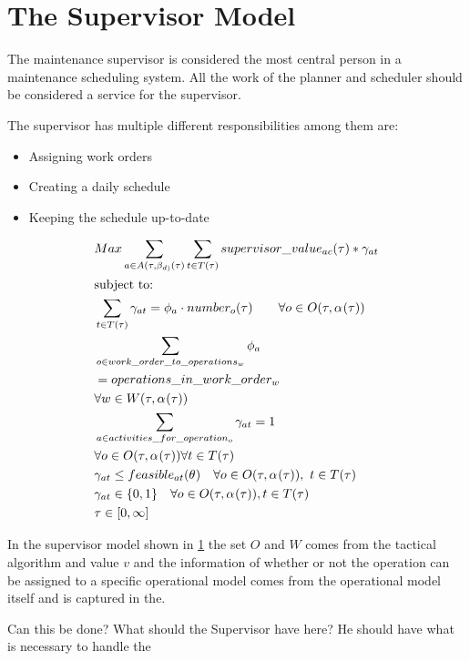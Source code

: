 \section{The Supervisor Model}
The maintenance supervisor is considered the most central person in a maintenance scheduling system. 
All the work of the planner and scheduler should be considered a service for the supervisor.

The supervisor has multiple different responsibilities among them are: 

\begin{itemize}
	\item Assigning work orders
	\item Creating a daily schedule
	\item Keeping the schedule up-to-date
\end{itemize}


\begin{alignat}{2}
	& Max \sum_{a \in A(\tau, \beta_{d)}(\tau)} \sum_{t \in T(\tau)} supervisor\_value_{ac}(\tau) * \gamma_{at} \\ 
	& \text{subject to:} \notag \\ 
	& \sum_{t \in T(\tau)} \gamma_{at} = \phi_{a} \cdot number_{o}(\tau) \quad \quad \forall o \in O(\tau, \alpha_{}(\tau) )  \\
	& \sum_{o \in work\_order\_to\_operations_{w}} \phi_{a}  \notag\\ 
	& = operations\_in\_work\_order_{w} \notag\\ 
	& \forall w \in W(\tau, \alpha_{}(\tau)) \\
	& \sum_{a \in activities\_for\_operation_{o}} \gamma_{at} = 1 \notag\\
	& \forall o \in O(\tau, \alpha_{}(\tau) ) \forall t \in T(\tau) \\  
	& \gamma_{at} \leq feasible_{at}(\theta_{}) \quad \forall o \in O(\tau, \alpha_{}(\tau) ), \ t \in T(\tau) \\
	& \gamma_{at} \in \{0, 1\} \quad \forall o \in O(\tau, \alpha_{}(\tau) ), t \in T(\tau) \\ 
    & \tau \in  [0, \infty] 
\end{alignat}

In the supervisor model shown in \ref{} the set $O$ and $W$ comes from the tactical algorithm
and value $v$ and the information of whether or not the operation can be assigned to a 
specific operational model comes from the operational model itself and is captured in the.

Can this be done? What should the Supervisor have here? He should have what is necessary to
handle the
